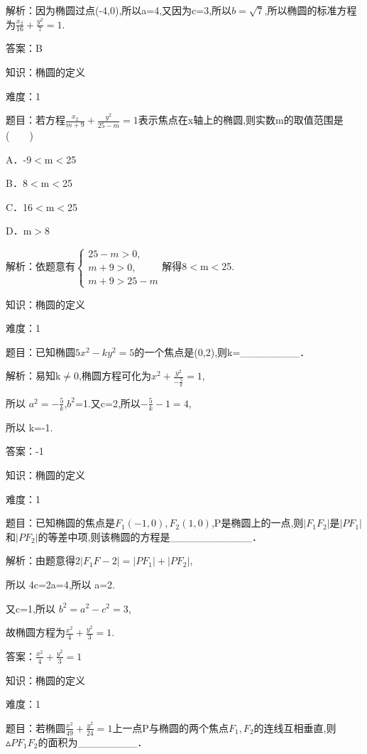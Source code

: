 \documentclass{article} %
\begin{document}
解析：因为椭圆过点(-4,0),所以a=4,又因为c=3,所以$b=\sqrt{7}$,所以椭圆的标准方程为$\frac{x_2}{16}+\frac{y^2}{7}=1$.

答案：B



知识：椭圆的定义

难度：1

题目：若方程$\frac{x_2}{m+9}+\frac{y^2}{25-m}=1$表示焦点在x轴上的椭圆,则实数m的取值范围是(　　)

A．-9${<}$m${<}$25   

B．8${<}$m${<}$25

C．16${<}$m${<}$25   

D．m${>}$8

解析：依题意有$\left\{
\begin{array}{l}
25-m > 0, \\
m+9>0, \\
m+9>25-m
\end{array}
\right.$解得8${<}$m${<}$25.



知识：椭圆的定义

难度：1

题目：已知椭圆$5x^{2}-ky^{2}=5$的一个焦点是(0,2),则k=\_\_\_\_\_\_\_\_．

解析：易知k${\neq}$0,椭圆方程可化为$x^{2}+\frac{y^2}{-\frac{5}{k}}=1$,

所以 $a^{2}=-\frac{5}{k}$,$b^{2}$=1.又c=2,所以$-\frac{5}{k}-1=4$,

所以 k=-1.

答案：-1



知识：椭圆的定义

难度：1

题目：已知椭圆的焦点是$F_{1}(-1,0),F_{2}(1,0)$,P是椭圆上的一点,则$|F_1F_2|$是$|PF_1|$和$|PF_2|$的等差中项,则该椭圆的方程是\_\_\_\_\_\_\_\_\_\_\_．

解析：由题意得$2|F_1F-2|=|PF_1|+|PF_2|$,

所以 4c=2a=4,所以 a=2.

又c=1,所以 $b^{2}=a^{2}-c^{2}=3$,

故椭圆方程为$\frac{x^2}{4}+\frac{y^2}{3}=1$.

答案：$\frac{x^2}{4}+\frac{y^2}{3}=1$



知识：椭圆的定义

难度：1

题目：若椭圆$\frac{x^2}{49}+\frac{y^2}{24}=1$上一点P与椭圆的两个焦点$F_{1},F_{2}$的连线互相垂直,则${\vartriangle} PF_{1}F_{2}$的面积为\_\_\_\_\_\_\_\_．
\end{document}
